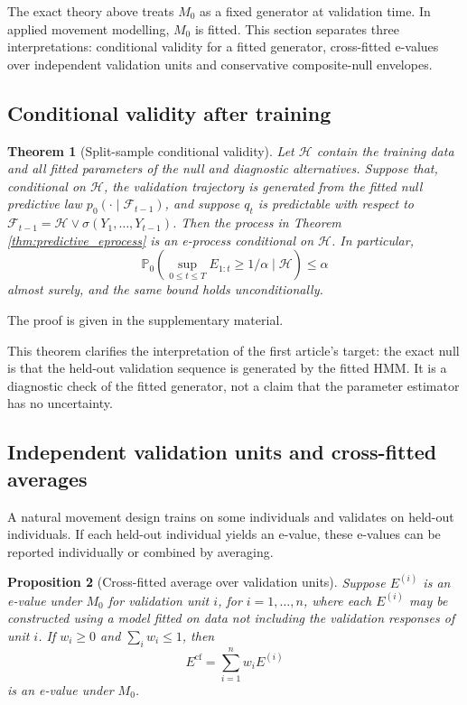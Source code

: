 \documentclass[pdflatex,sn-basic]{sn-jnl}
\theoremstyle{thmstyleone}
\newtheorem{theorem}{Theorem}
\newtheorem{proposition}[theorem]{Proposition}
\theoremstyle{thmstyletwo}
\theoremstyle{thmstylethree}
\newcommand{\Pbb}{\mathbb P}
\newcommand{\1}{\mathbf 1}
\newcommand{\calF}{\mathcal F}
\newcommand{\calH}{\mathcal H}
\begin{document}
The exact theory above treats $M_0$ as a fixed generator at validation time. In applied movement modelling, $M_0$ is fitted. This section separates three interpretations: conditional validity for a fitted generator, cross-fitted e-values over independent validation units and conservative composite-null envelopes.

\subsection{Conditional validity after training}

\begin{theorem}[Split-sample conditional validity]
\label{thm:split}
Let $\calH$ contain the training data and all fitted parameters of the null and diagnostic alternatives. Suppose that, conditional on $\calH$, the validation trajectory is generated from the fitted null predictive law $p_0(\cdot\mid\calF_{t-1})$, and suppose $q_t$ is predictable with respect to $\calF_{t-1}=\calH\vee\sigma(Y_1,\ldots,Y_{t-1})$. Then the process in Theorem \ref{thm:predictive_eprocess} is an e-process conditional on $\calH$. In particular,
\begin{equation}
 \Pbb_0\left(\sup_{0 \le t \le T}E_{1:t}\geq1/\alpha\mid\calH\right)\leq\alpha
\end{equation}
almost surely, and the same bound holds unconditionally.
\end{theorem}

\noindent The proof is given in the supplementary material.

This theorem clarifies the interpretation of the first article's target: the exact null is that the held-out validation sequence is generated by the fitted HMM. It is a diagnostic check of the fitted generator, not a claim that the parameter estimator has no uncertainty.

\subsection{Independent validation units and cross-fitted averages}

A natural movement design trains on some individuals and validates on held-out individuals. If each held-out individual yields an e-value, these e-values can be reported individually or combined by averaging.

\begin{proposition}[Cross-fitted average over validation units]
\label{prop:crossfit_average}
Suppose $E^{(i)}$ is an e-value under $M_0$ for validation unit $i$, for $i=1,\ldots,n$, where each $E^{(i)}$ may be constructed using a model fitted on data not including the validation responses of unit $i$. If $w_i\geq0$ and $\sum_iw_i\leq1$, then
\begin{equation}
 E^{\mathrm{cf}}=\sum_{i=1}^nw_iE^{(i)}
\end{equation}
is an e-value under $M_0$.
\end{proposition}
\end{document}
